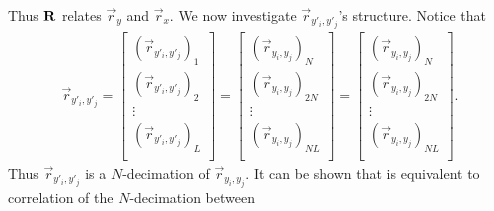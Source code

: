 \documentclass[a4paper, openany, oneside]{memoir}
\begin{document}
Thus $\boldsymbol{\mathbf{R}}$ relates $\vec{r}_y$ and $\vec{r}_x$. We now investigate $\vec{r}_{y'_i,y'_j}$'s structure. Notice that
\begin{align*}
    \vec{r}_{y'_i,y'_j}
    = \begin{bmatrix}
        (\vec{r}_{y'_i,y'_j})_1 \\
        (\vec{r}_{y'_i,y'_j})_2 \\
        \vdots \\
        (\vec{r}_{y'_i,y'_j})_{L} \\
    \end{bmatrix}
    = \begin{bmatrix}
        (\vec{r}_{y_i,y_j})_{N} \\
        (\vec{r}_{y_i,y_j})_{2N} \\
        \vdots \\
        (\vec{r}_{y_i,y_j})_{NL} \\
    \end{bmatrix}
    = \begin{bmatrix}
        (\vec{r}_{y_i,y_j})_{N} \\
        (\vec{r}_{y_i,y_j})_{2N} \\
        \vdots \\
        (\vec{r}_{y_i,y_j})_{NL} \\
    \end{bmatrix}.
\end{align*}
Thus $\vec{r}_{y'_i,y'_j}$ is a $N$-decimation of $\vec{r}_{y_i,y_j}$. It can be shown that is equivalent to correlation of the $N$-decimation between
\end{document}
